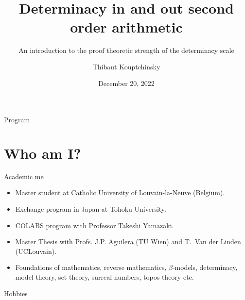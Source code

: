 \documentclass{beamer} %
\title[Determinacy axioms]{Determinacy in and out second order arithmetic}
\subtitle[]{An introduction to the proof theoretic strength of the determinacy scale}
\institute[Proof Theory Conference]{Proof Theory Conference \and UCLouvain}
\author{Thibaut Kouptchinsky}
\date{December 20, 2022}
\begin{document}
\begin{frame}
	\titlepage
\end{frame}


\begin{frame}{Program}
    \tableofcontents
\end{frame}


\section{Who am I?}

\begin{frame}{Academic me}
    \begin{itemize}
        \item<1-> Master student at Catholic University of Louvain-la-Neuve (Belgium).
        \item<2-> Exchange program in Japan at Tohoku University.
        \item<3-> COLABS program with Professor Takeshi Yamazaki.
        \item<4-> Master Thesis with Profs. J.P. Aguilera (TU Wien) and T.~Van der Linden (UCLouvain).
        \item<5-> Foundations of mathematics, reverse mathematics, $\beta$-models, determinacy, model theory,
          set theory, surreal numbers, topos theory etc. 
    \end{itemize}
\end{frame}


\begin{frame}{Hobbies}
    \begin{center}
        \end{center}

\end{frame}
\end{document}
